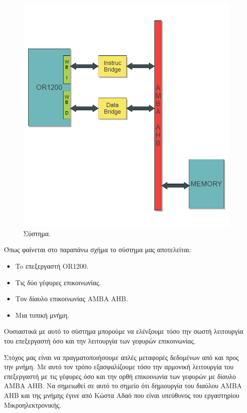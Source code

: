 \documentclass[a4paper,10pt]{article}
\numberwithin{figure}{section}
\numberwithin{table}{section}
\begin{document}
\vspace{0.7cm}
\begin{figure}[h!]
 \centering
 \includegraphics[bb=0 0 806 871,scale=0.42]{./Images/or1200_D_I_wb_ahb_mem.png}
 \caption{Σύστημα.}
\end{figure}
\newpage

Όπως φαίνεται στο παραπάνω σχήμα το σύστημα μας αποτελείται:
\begin{itemize}
 \item To επεξεργαστή OR1200.
 \item Τις δύο γέφυρες επικοινωνίας.
 \item Τον δίαυλο επικοινωνίας AMBA AHB.
 \item Μια τυπική μνήμη.
\end{itemize}



Ουσιαστικά με αυτό το σύστημα μπορούμε να ελένξουμε τόσο την σωστή λειτουργία του επεξεργαστή όσο και την λειτουργία των γεφυρών επικοινωνίας.

Στόχος μας είναι να πραγματοποιήσουμε απλές μεταφορές δεδομένων από και προς την μνήμη. Με αυτό τον τρόπο εξασφαλίζουμε τόσο την αρμονική λειτουργία του επεξεργαστή με τις γέφυρες όσο και την ορθή επικοινωνία των γεφυρών με δίαυλο AMBA AHB. Να σημειωθεί σε αυτό το σημείο ότι δημιουργία του διαύλου AMBA ΑΗΒ και της μνήμης έγινε από Κώστα Αδαό που είναι υπεύθυνος του εργαστηρίου Μικροηλεκτρονικής.
\newline
\end{document}
